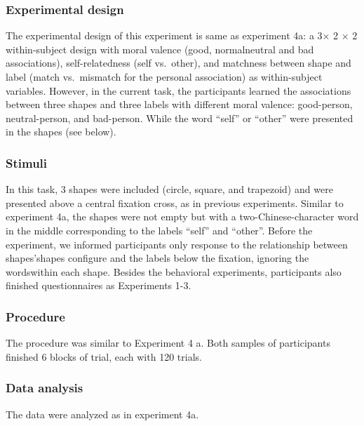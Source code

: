 \documentclass[man]{apa6}
\begin{document}
\hypertarget{experimental-design-1}{%
\subsubsection{Experimental design}\label{experimental-design-1}}

The experimental design of this experiment is same as experiment 4a: a 3× 2 × 2 within-subject design with moral valence (good, normalneutral and bad associations), self-relatedness (self vs.~other), and matchness between shape and label (match vs.~mismatch for the personal association) as within-subject variables. However, in the current task, the participants learned the associations between three shapes and three labels with different moral valence: good-person, neutral-person, and bad-person. While the word \enquote{self} or \enquote{other} were presented in the shapes (see below).

\hypertarget{stimuli-2}{%
\subsubsection{Stimuli}\label{stimuli-2}}

In this task, 3 shapes were included (circle, square, and trapezoid) and were presented above a central fixation cross, as in previous experiments. Similar to experiment 4a, the shapes were not empty but with a two-Chinese-character word in the middle corresponding to the labels \enquote{self} and \enquote{other}. Before the experiment, we informed participants only response to the relationship between shapes'shapes configure and the labels below the fixation, ignoring the wordswithin each shape. Besides the behavioral experiments, participants also finished questionnaires as Experiments 1-3.

\hypertarget{procedure-7}{%
\subsubsection{Procedure}\label{procedure-7}}

The procedure was similar to Experiment 4 a. Both samples of participants finished 6 blocks of trial, each with 120 trials.

\hypertarget{data-analysis-7}{%
\subsubsection{Data analysis}\label{data-analysis-7}}

The data were analyzed as in experiment 4a.
\end{document}
